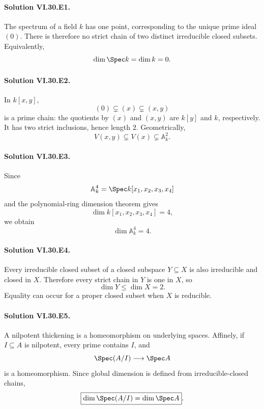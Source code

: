 
\paragraph{Solution VI.30.E1.}
The spectrum of a field \(k\) has one point, corresponding to the unique prime ideal \((0)\).
There is therefore no strict chain of two distinct irreducible closed subsets. Equivalently,
\[
\dim\Spec k=\dim k=0.
\]

\paragraph{Solution VI.30.E2.}
In \(k[x,y]\),
\[
(0)\subsetneq(x)\subsetneq(x,y)
\]
is a prime chain: the quotients by \((x)\) and \((x,y)\) are \(k[y]\) and \(k\), respectively.
It has two strict inclusions, hence length \(2\). Geometrically,
\[
V(x,y)\subsetneq V(x)\subsetneq\mathbb A^2_k.
\]

\paragraph{Solution VI.30.E3.}
Since
\[
\mathbb A^4_k=\Spec k[x_1,x_2,x_3,x_4]
\]
and the polynomial-ring dimension theorem gives
\[
\dim k[x_1,x_2,x_3,x_4]=4,
\]
we obtain
\[
\boxed{\dim\mathbb A^4_k=4}.
\]

\paragraph{Solution VI.30.E4.}
Every irreducible closed subset of a closed subspace \(Y\subseteq X\) is also irreducible and closed
in \(X\). Therefore every strict chain in \(Y\) is one in \(X\), so
\[
\boxed{\dim Y\le\dim X=2}.
\]
Equality can occur for a proper closed subset when \(X\) is reducible.

\paragraph{Solution VI.30.E5.}
A nilpotent thickening is a homeomorphism on underlying spaces. Affinely, if \(I\subseteq A\) is
nilpotent, every prime contains \(I\), and
\[
\Spec(A/I)\longrightarrow\Spec A
\]
is a homeomorphism. Since global dimension is defined from irreducible-closed chains,
\[
\boxed{\dim\Spec(A/I)=\dim\Spec A}.
\]


